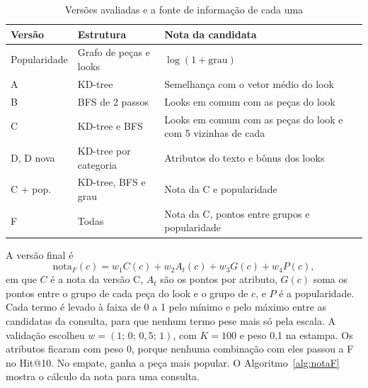 \documentclass[conference]{IEEEtran}
\begin{document}
\begin{table}[t]
\caption{Versões avaliadas e a fonte de informação de cada uma}
\label{tab:versoes}
\centering
\footnotesize
\begin{tabular}{@{}lp{2.6cm}p{3.6cm}@{}}
\toprule
Versão & Estrutura & Nota da candidata \\
\midrule
Popularidade & Grafo de peças e looks & $\log(1 + \text{grau})$ \\
A & KD-tree & Semelhança com o vetor médio do look \\
B & BFS de 2 passos & Looks em comum com as peças do look \\
C & KD-tree e BFS & Looks em comum com as peças do look e com 5 vizinhas de cada \\
D, D nova & KD-tree por categoria & Atributos do texto e bônus dos looks \\
C + pop. & KD-tree, BFS e grau & Nota da C e popularidade \\
F & Todas & Nota da C, pontos entre grupos e popularidade \\
\bottomrule
\end{tabular}
\end{table}

A versão final é
\begin{equation}
\text{nota}_F(c) = w_1 C(c) + w_2 A_t(c) + w_3 G(c) + w_4 P(c),
\label{eq:notaF}
\end{equation}
em que $C$ é a nota da versão C, $A_t$ são os pontos por atributo, $G(c)$ soma os pontos entre o grupo de cada peça do look e o grupo de $c$, e $P$ é a popularidade. Cada termo é levado à faixa de 0 a 1 pelo mínimo e pelo máximo entre as candidatas da consulta, para que nenhum termo pese mais só pela escala. A validação escolheu $w = (1;\, 0;\, 0{,}5;\, 1)$, com $K = 100$ e peso 0,1 na estampa. Os atributos ficaram com peso 0, porque nenhuma combinação com eles passou a F no Hit@10. No empate, ganha a peça mais popular. O Algoritmo~\ref{alg:notaF} mostra o cálculo da nota para uma consulta.
\end{document}
